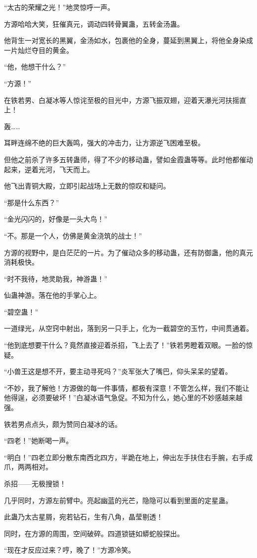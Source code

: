 \begin{this_body}
“太古的荣耀之光！”地灵惊呼一声。

方源哈哈大笑，狂催真元，调动四转骨翼蛊，五转金汤蛊。

他背生一对宽长的黑翼，金汤如水，包裹他的全身，蔓延到黑翼上，将他全身染成一片灿烂夺目的黄金。

“他，他想干什么？”

“方源！”

在铁若男、白凝冰等人惊诧至极的目光中，方源飞振双翅，迎着天瀑光河扶摇直上！

轰……

耳畔连绵不绝的巨大轰鸣，强大的冲击力，让方源逆飞困难至极。

但他之前杀了许多五转蛊师，得了不少的移动蛊，譬如金霞蛊等等。此时他都催动起来，逆着光河，飞天而上。

他飞出青铜大殿，立即引起战场上无数的惊叹和疑问。

“那是什么东西？”

“金光闪闪的，好像是一头大鸟！”

“不。那是一个人，仿佛是黄金浇筑的战士！”

方源的视野中，是白茫茫的一片。为了催动众多的移动蛊，还有防御蛊，他的真元消耗极快。

“时不我待，地灵助我，神游蛊！”

仙蛊神游。落在他的手掌心上。

“碧空蛊！”

一道绿光，从空窍中射出，落到另一只手上，化为一截碧空的玉竹，中间贯通着。

“他到底想要干什么？竟然直接迎着杀招，飞上去了！”铁若男瞪着双眼。一脸的惊疑。

“小兽王这是想不开，要主动寻死吗？”炎军张大了嘴巴，仰头呆呆的望着。

“不妙，我了解他！方源做的每一件事情，都极有深意！不管怎么样，我们不能让他得逞，必须要破坏！”白凝冰语气急促。不知为什么，她心里的不妙感越来越强。

铁若男点点头，颇为赞同白凝冰的话。

“四老！”她断喝一声。

“明白！”四老立即分散东南西北四方，半跪在地上，伸出左手扶住右手腕，右手成爪，两两相对。

杀招——无极搜锁！

几乎同时，方源左前臂中。亮起幽蓝的光芒，隐隐可以看到里面的定星蛊。

此蛊乃太古星屑，宛若钻石，生有八角，晶莹剔透！

同时，在方源的周围，空间破碎。四道锁链如蟒蛇般探出。

“现在才反应过来？哼，晚了！”方源冷笑。


\end{this_body}
